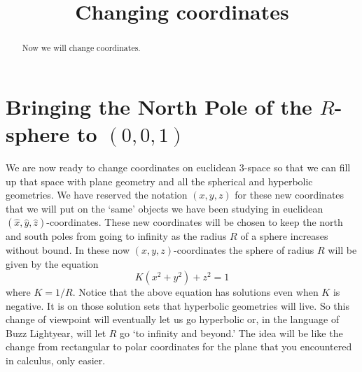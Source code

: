 \documentclass{ximera}
\title{Changing coordinates}
\begin{document}
\begin{abstract}
Now we will change coordinates.
\end{abstract}
\maketitle


\section{Bringing the North Pole of the $R$-sphere to $\left(
0,0,1\right)  $}

We are now ready to change coordinates on euclidean $3$-space so that we can fill up that space  with plane geometry and all the spherical and hyperbolic  geometries.
We have reserved the notation $\left(  x,y,z\right)  $ for these new
coordinates that we will put on the `same' objects we have been studying in
euclidean $\left(  \hat{x},\hat{y},\hat{z}\right)  $-coordinates. These new
coordinates will be chosen to keep the north and south poles from going to
infinity as the radius $R$ of a sphere increases without bound. In these now $\left(  x,y,z\right)  $-coordinates the sphere of radius $R$ will be given by the equation
\[
K\left(x^{2}+y^{2}\right)+z^{2}=1
\]
where $K=1/R$. Notice that the above equation has solutions even when $K$ is negative. It is on those solution sets that hyperbolic geometries will live. So this change of
viewpoint will eventually let us go hyperbolic or, in the language of Buzz
Lightyear, will let $R$ go `to infinity and beyond.' The
idea will be like the change from rectangular to polar coordinates for the
plane that you encountered in calculus, only easier. 
\end{document}
